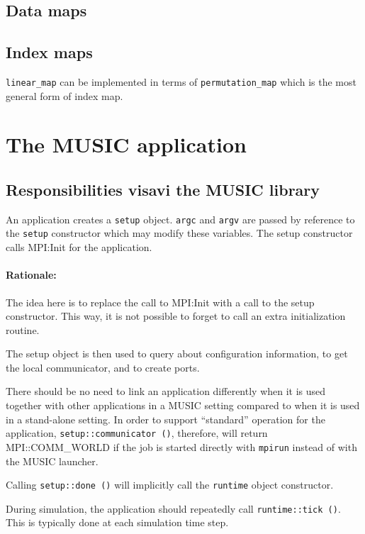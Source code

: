 \documentclass[a4paper]{report}
\newenvironment{rationale}%
{\par\paragraph{Rationale:}}%
{\par}
\begin{document}
\subsection{Data maps}

\subsection{Index maps}

\lstinline|linear_map| can be implemented in terms of
\lstinline|permutation_map| which is the most general form of index map.

\section{The MUSIC application}

\subsection{Responsibilities visavi the MUSIC library}
\label{sec:responsibilities}

An application creates a \lstinline|setup| object.  \lstinline|argc| and
\lstinline|argv| are passed by reference to the \lstinline|setup| constructor
which may modify these variables.  The setup constructor calls
MPI:Init for the application.

\begin{rationale}
  The idea here is to replace the call to MPI:Init with a call to the
  setup constructor.  This way, it is not possible to forget to call
  an extra initialization routine.
\end{rationale}

The setup object is then used to query about configuration
information, to get the local communicator, and to create ports.

There should be no need to link an application differently when it is
used together with other applications in a MUSIC setting compared to
when it is used in a stand-alone setting.  In order to support
``standard'' operation for the application,
\lstinline|setup::communicator ()|, therefore, will return MPI::COMM\_WORLD
if the job is started directly with \lstinline|mpirun| instead of with the
MUSIC launcher.

Calling \lstinline|setup::done ()| will implicitly call the \lstinline|runtime|
object constructor.

During simulation, the application should repeatedly call
\lstinline|runtime::tick ()|.  This is typically done at each simulation
time step.
\end{document}
